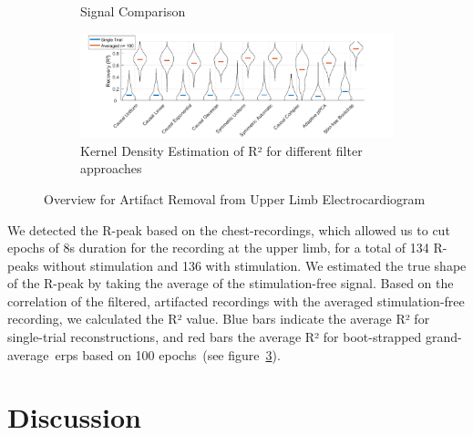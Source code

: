\documentclass[a4paper]{article}
\newcommand{\figref}[1]{(see figure~\ref{#1})}
\begin{document}
\begin{figure}[hbtp]
\begin{subfigure}{.75\textwidth}
\begin{subfigure}{.45\textwidth}
        \end{subfigure}
    \caption{Signal Comparison}\label{fig:ecgRaw}
    \end{subfigure}
    \begin{subfigure}{1.0\textwidth}
        \includegraphics[width=\textwidth]{img/eva/ecg_R2.png}
        \caption{Kernel Density Estimation of R² for different filter approaches}\label{fig:ecgR2}
    \end{subfigure}
    \caption{Overview for Artifact Removal from Upper Limb Electrocardiogram}
\end{figure}

We detected the R-peak based on the chest-recordings, which allowed us to cut epochs of 8s duration for the recording at the upper limb, for a total of 134 R-peaks without stimulation and 136 with stimulation. We estimated the true shape of the R-peak by taking the average of the stimulation-free signal.
Based on  the correlation of the filtered, artifacted recordings with the averaged stimulation-free recording, we calculated the R² value.
Blue bars indicate the average R² for single-trial reconstructions, and red bars the average R² for boot-strapped grand-average~\gls{erp}s based on 100 epochs~\figref{fig:ecgR2}.

\section{Discussion}

\end{document}
